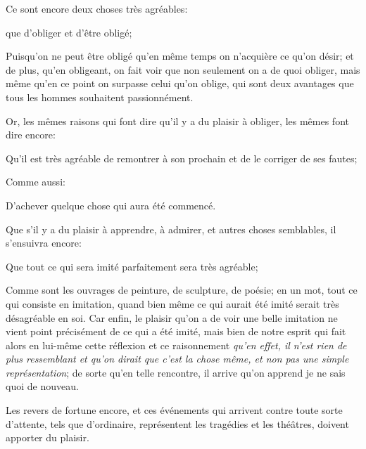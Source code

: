 \bigbreak

Ce sont encore deux choses très agréables:

\begin{lieu}
	que d'obliger et d’être obligé;
\end{lieu}

Puisqu'on ne peut être obligé qu'en même temps on n'acquière ce qu'on désir; et de plus, qu'en obligeant,
on fait voir que non seulement on a de quoi obliger, mais même qu'en ce point on surpasse celui qu'on
oblige, qui sont deux avantages que tous les hommes souhaitent passionnément.

\bigbreak

Or, les mêmes raisons qui font dire qu'il y a du plaisir à obliger, les mêmes font dire encore:

\begin{lieu}
	Qu'il est très agréable de remontrer à son prochain et de le corriger de ses fautes;
\end{lieu}

Comme aussi:

\begin{lieu}
	D'achever quelque chose qui aura été commencé.
\end{lieu}

\bigbreak

Que s'il y a du plaisir à apprendre, à admirer, et autres choses semblables, il s'ensuivra encore:

\begin{lieu}
	Que tout ce qui sera imité parfaitement sera très agréable;
\end{lieu}

Comme sont les ouvrages de peinture, de sculpture, de poésie; en un mot, tout ce qui consiste en imitation,
quand bien même ce qui aurait été imité serait très désagréable en soi. Car enfin, le plaisir qu'on a de
voir une belle imitation ne vient point précisément de ce qui a été imité, mais bien de notre esprit qui
fait alors en lui-même cette réflexion et ce raisonnement \emph{qu'en effet, il n'est rien de plus ressemblant
et qu'on dirait que c'est la chose même,  et non pas une simple représentation}; de sorte qu'en telle rencontre,
il arrive qu'on apprend je ne sais quoi de nouveau.

\bigbreak

\begin{lieu}
	Les revers de fortune encore, et ces événements qui arrivent contre toute sorte d'attente, tels que
	d'ordinaire, représentent les tragédies et les théâtres, doivent apporter du plaisir.
\end{lieu}


